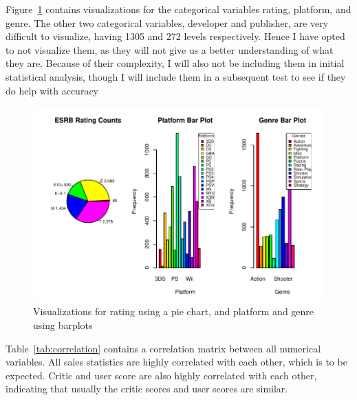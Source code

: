 \documentclass[12pt]{article}
\begin{document}
Figure~\ref{fig:categoricalplots} contains visualizations for the categorical variables rating, platform, and genre.
The other two categorical variables, developer and publisher, are very difficult to visualize, having 1305 and 272 levels respectively.
Hence I have opted to not visualize them, as they will not give us a better understanding of what they are. Because of their complexity, 
I will also not be including them in initial statistical analysis, though I will include them in a subsequent test to see if they do 
help with accuracy

\begin{figure}[tbp]
  \centering
  \includegraphics[width=\textwidth]{categoricalplots.pdf}
  \caption{Visualizations for rating using a pie chart, and platform and genre using barplots}
  \label{fig:categoricalplots}
\end{figure}


Table~\ref{tab:correlation} contains a correlation matrix between all numerical variables. All sales statistics are highly
correlated with each other, which is to be expected. Critic and user score are also highly correlated with each other, indicating
that usually the critic scores and user scores are similar.
\end{document}
